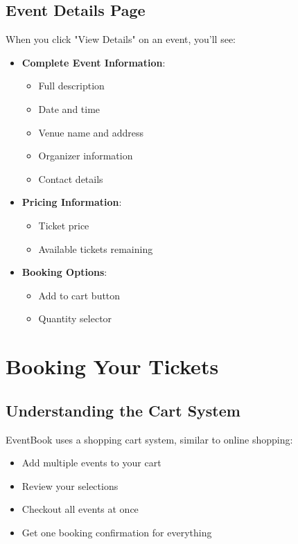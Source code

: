 \documentclass[12pt,a4paper]{article}
\begin{document}
\subsection{Event Details Page}

When you click "View Details" on an event, you'll see:

\begin{itemize}
    \item \textbf{Complete Event Information}:
        \begin{itemize}
            \item Full description
            \item Date and time
            \item Venue name and address
            \item Organizer information
            \item Contact details
        \end{itemize}
    \item \textbf{Pricing Information}:
        \begin{itemize}
            \item Ticket price
            \item Available tickets remaining
        \end{itemize}
    \item \textbf{Booking Options}:
        \begin{itemize}
            \item Add to cart button
            \item Quantity selector
        \end{itemize}
\end{itemize}

\section{Booking Your Tickets}

\subsection{Understanding the Cart System}

EventBook uses a shopping cart system, similar to online shopping:
\begin{itemize}
    \item Add multiple events to your cart
    \item Review your selections
    \item Checkout all events at once
    \item Get one booking confirmation for everything
\end{itemize}
\end{document}
